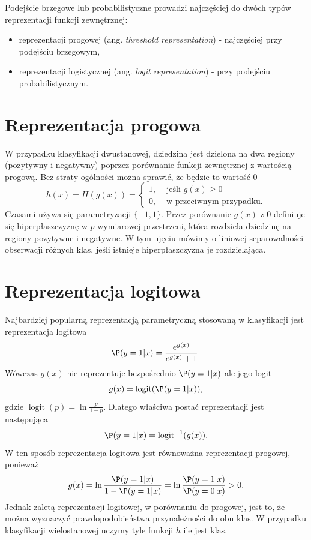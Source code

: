 \documentclass[
]{book}
\providecommand{\tightlist}{%
  \setlength{\itemsep}{0pt}\setlength{\parskip}{0pt}}
\newcommand{\logit}{\operatorname{logit}}
\theoremstyle{plain}
\theoremstyle{definition}
\theoremstyle{definition}
\theoremstyle{definition}
\theoremstyle{definition}
\theoremstyle{definition}
\theoremstyle{remark}
\begin{document}
Podejście brzegowe lub probabilistyczne prowadzi najczęściej do dwóch typów reprezentacji funkcji zewnętrznej:

\begin{itemize}
\tightlist
\item
  reprezentacji progowej (ang. \emph{threshold representation}) - najczęściej przy podejściu brzegowym,
\item
  reprezentacji logistycznej (ang. \emph{logit representation}) - przy podejściu probabilistycznym.
\end{itemize}

\section{Reprezentacja progowa}\label{reprezentacja-progowa}

W przypadku klasyfikacji dwustanowej, dziedzina jest dzielona na dwa regiony (pozytywny i negatywny) poprzez porównanie funkcji zewnętrznej z wartością progową. Bez straty ogólności można sprawić, że będzie to wartość 0
\begin{equation}
    h(x)=H(g(x))= \begin{cases}
        1, &\text{ jeśli } g(x)\geq 0\\
        0, &\text{ w przeciwnym przypadku.}
    \end{cases}
\end{equation}
Czasami używa się parametryzacji \(\{-1,1\}\).
Przez porównanie \(g(x)\) z 0 definiuje się hiperpłaszczyznę w \(p\) wymiarowej przestrzeni, która rozdziela dziedzinę na regiony pozytywne i negatywne. W tym ujęciu mówimy o liniowej separowalności obserwacji różnych klas, jeśli istnieje hiperpłaszczyzna je rozdzielająca.

\section{Reprezentacja logitowa}\label{reprezentacja-logitowa}

Najbardziej popularną reprezentacją parametryczną stosowaną w klasyfikacji jest reprezentacja logitowa
\begin{equation}
    \P(y=1|x)=\frac{e^{g(x)}}{e^{g(x)}+1}.
\end{equation}
Wówczas \(g(x)\) nie reprezentuje bezpośrednio \(\P(y=1|x)\) ale jego logit
\begin{equation}
    g(x)=\logit(\P(y=1|x)),
\end{equation}
gdzie \(\logit(p)=\ln\frac{p}{1-p}\). Dlatego właściwa postać reprezentacji jest następująca
\begin{equation}
    \P(y=1|x)=\logit^{-1}(g(x)).
\end{equation}
W ten sposób reprezentacja logitowa jest równoważna reprezentacji progowej, ponieważ
\begin{equation}
    g(x)=\ln\frac{\P(y=1|x)}{1-\P(y=1|x)}=\ln\frac{\P(y=1|x)}{\P(y=0|x)}>0.
\end{equation}
Jednak zaletą reprezentacji logitowej, w porównaniu do progowej, jest to, że można wyznaczyć prawdopodobieństwa przynależności do obu klas. W przypadku klasyfikacji wielostanowej uczymy tyle funkcji \(h\) ile jest klas.
\end{document}
